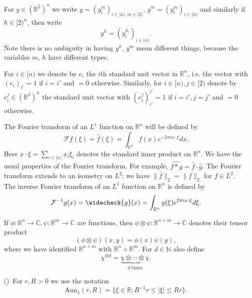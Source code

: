\documentclass[12pt,reqno]{amsart}
\newcommand{\auto}{{({\tiny\faCar})}}
\theoremstyle{plain}
\numberwithin{equation}{section}
\theoremstyle{remark}
\newcommand{\R}{{\mathbb R}}
\newcommand{\N}{{\mathbb N}}
\newcommand{\C}{{\mathbb C}}
\begin{document}
For $y\in(\mathbb{R}^2)^n$ we write $y=(y^m_i)_{i\in [n), m\in [2)}$, $y^m=(y^m_i)_{i\in [n)}$ and similarly if $h\in [2)^n$, then write
\begin{equation}\label{auto:binary-coordinate-selection} y^h = (y_i^{h_i})_{i\in [n)}. \end{equation}
Note there is no ambiguity in having $y^h$, $y^m$ mean different things, because the variables $m$, $h$ have different types.

For $i\in [n)$ we denote by $e_i$ the $i$th standard unit vector in $\R^n$, i.e. the vector with $(e_i)_{i'}=1$ if $i=i'$ and $=0$ otherwise.
Similarly, for $i\in [n), j\in [2)$ denote by $e_{i}^j\in (\R^2)^n$ the standard unit vector with $(e_{i}^j)_{i'}^{j'}=1$ if $i=i', j=j'$ and $=0$ otherwise.

The Fourier transform of an $L^1$ function on $\R^n$ will be defined by
\begin{equation}\label{auto:Fourier-transform-formula}\mathcal{F}f(\xi)= \widehat{f}(\xi) = \int_{\R^n} f(x) e^{-2\pi i x\cdot \xi} dx.\end{equation}
Here $x\cdot \xi=\sum_{i\in [n)} x_i \xi_i$ denotes the standard inner product on $\R^n$.
We have the usual properties of the Fourier transform. For example, $\widehat{f*g}=\widehat{f}\cdot \widehat{g}$.
The Fourier transform extends to an isometry on $L^2$: we have $\|\widehat{f}\|_2 = \|f\|_2$ for $f\in L^2$.
The inverse Fourier transform of an $L^1$ function on $\R^n$ is defined by
\begin{equation}\label{auto:inverse-Fourier-transform-formula} \mathcal{F}^{-1}g(x)= \widecheck{g}(x) = \int_{\R^n} g(\xi) e^{2\pi i x\cdot \xi} d\xi.\end{equation}

If $\phi:\R^n\to \C, \psi:\R^m\to\C$ are functions, then $\phi\otimes \psi:\R^{n+m}\to\C$ denotes their tensor product
\begin{equation}\label{auto:tensor-product-formula} (\phi\otimes \psi)(x,y) = \phi(x)\psi(y), \end{equation}
where we have identified $\R^{n+m}$ with $\R^n\times \R^m$. For $d\in\N$ also define
\begin{equation}\label{auto:tensor-power-formula}\chi^{\otimes d} = \underbrace{\chi \otimes \cdots \otimes \chi}_{d\;\text{times}}.\end{equation}

\auto\ For $r,R>0$ we use the notation
\begin{equation}\label{one dimensional annulus notation}
\mathrm{Ann}_1(r,R)=\{\xi\in\R:R^{-1}r\le|\xi|\le Rr\}.
\end{equation}
\end{document}

